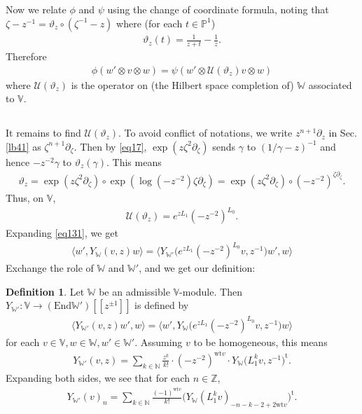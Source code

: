 \documentclass[12pt,a4paper,notitlepage]{article}
\theoremstyle{definition}
\newtheorem{df}{Definition}[section]
\theoremstyle{plain}
\newcommand{\mc}{\mathcal}
\newcommand{\tr}{\mathrm{t}} %
\newcommand{\End}{\mathrm{End}} %
\newcommand{\bigbk}[1]{\big\langle {#1}\big\rangle}
\newcommand{\Vbb}{\mathbb V}
\newcommand{\Wbb}{\mathbb W}
\newcommand{\Nbb}{\mathbb N}
\newcommand{\Zbb}{\mathbb Z}
\newcommand{\Pbb}{\mathbb P}
\newcommand{\wt}{\mathrm{wt}}
\numberwithin{equation}{section}
\begin{document}
Now we relate $\phi$ and $\psi$ using the change of coordinate formula, noting that $\zeta-z^{-1}=\vartheta_z\circ(\zeta^{-1}-z)$ where (for each $t\in\Pbb^1$) 
\begin{align}
\vartheta_z(t)=\frac1{z+t}-\frac 1z.\label{eq195}
\end{align}
Therefore
\begin{align}
\phi(w'\otimes v\otimes w)=\psi(w'\otimes \mc U(\vartheta_z) v\otimes w)\label{eq131}	
\end{align}
where $\mc U(\vartheta_z)$ is the operator on (the Hilbert space completion of) $\Wbb$ associated to $\Vbb$.

\subsection{}

It remains to find $\mc U(\vartheta_z)$. To avoid conflict of notations, we write $z^{n+1}\partial_z$ in Sec. \ref{lb41} as $\zeta^{n+1}\partial_\zeta$. Then by \eqref{eq17}, $\exp(z\zeta^2\partial_\zeta)$ sends $\gamma$ to $(1/\gamma-z)^{-1}$ and hence $-z^{-2}\gamma$ to $\vartheta_z(\gamma)$. This means
\begin{align}
\vartheta_z=\exp(z\zeta^2\partial_\zeta)\circ \exp(\log(-z^{-2})\zeta\partial_\zeta)=\exp(z\zeta^2\partial_\zeta)\circ (-z^{-2})^{\zeta\partial_\zeta}.
\end{align}
Thus, on $\Vbb$,
\begin{align}
\mc U(\vartheta_z)=e^{zL_1}(-z^{-2})^{L_0}.	\label{eq196}
\end{align}
Expanding \eqref{eq131}, we get
\begin{align*}
\bigbk{w',Y_\Wbb(v,z)w}=\bigbk{Y_{\Wbb'}\big(e^{zL_1}(-z^{-2})^{L_0}v,z^{-1}\big)w',w}	
\end{align*}
Exchange the role of $\Wbb$ and $\Wbb'$, and we get our definition:

\begin{df}
Let $\Wbb$ be an admissible $\Vbb$-module. Then $Y_{\Wbb'}:\Vbb\rightarrow(\End\Wbb')[[z^{\pm1}]]$ is defined by
\begin{align}
\bigbk{Y_{\Wbb'}(v,z)w',w}=\bigbk{w',Y_\Wbb\big(e^{zL_1}(-z^{-2})^{L_0}v,z^{-1}\big)w}\label{eq141}		
\end{align}
for each $v\in\Vbb,w\in\Wbb,w'\in\Wbb'$. Assuming $v$ to be homogeneous, this means
\begin{align}
Y_{\Wbb'}(v,z)=\sum_{k\in\Nbb}\frac {z^k}{k!}\cdot (-z^{-2})^{\wt v}\cdot Y_\Wbb\big(L_1^kv,z^{-1}\big)^\tr.
\end{align}
Expanding both sides, we see that for each $n\in\Zbb$,
\begin{align}
Y_{\Wbb'}(v)_n=\sum_{k\in\Nbb}\frac{(-1)^{\wt v}}{k!}\big(Y_\Wbb(L_1^kv)_{-n-k-2+2\wt v}\big)^\tr.\label{eq133}
\end{align}
\end{df}
\end{document}
